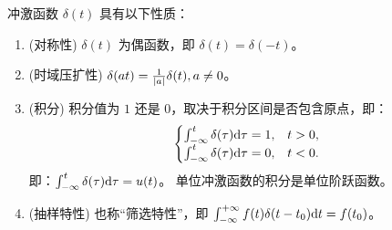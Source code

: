 \begin{property}[冲激函数的性质总结]
    冲激函数 $\delta(t)$ 具有以下性质：
    \begin{enumerate}
        \item (对称性) $\delta(t)$ 为偶函数，即 $\delta(t) = \delta(-t)$。
        \item (时域压扩性) $\delta(at) = \frac{1}{\left|a\right|}\delta(t), a \neq 0$。
        \item (积分) 积分值为 $1$ 还是 $0$，取决于积分区间是否包含原点，即：
            \begin{align*}
                \begin{cases}
                    \int_{-\infty}^{t}\delta(\tau)\mathrm{d}\tau = 1, & t > 0, \\
                    \int_{-\infty}^{t}\delta(\tau)\mathrm{d}\tau = 0, & t < 0.
                \end{cases}
            \end{align*}
            即：$\int_{-\infty}^{t}\delta(\tau)\mathrm{d}\tau = u(t)$。
            单位冲激函数的积分是单位阶跃函数。
        \item (抽样特性) 也称``筛选特性''，即 $\int_{-\infty}^{+\infty}f(t)\delta(t - t_0)\mathrm{d}t = f(t_0)$。
    \end{enumerate}
\end{property}


